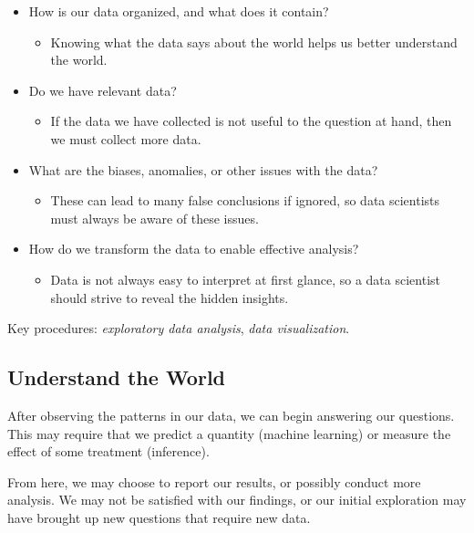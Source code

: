 \documentclass[
  letterpaper,
  DIV=11,
  numbers=noendperiod]{scrreprt}
\providecommand{\tightlist}{%
  \setlength{\itemsep}{0pt}\setlength{\parskip}{0pt}}\usepackage{longtable,booktabs,array}
\begin{document}
\begin{itemize}
\tightlist
\item
  How is our data organized, and what does it contain?

  \begin{itemize}
  \tightlist
  \item
    Knowing what the data says about the world helps us better
    understand the world.
  \end{itemize}
\item
  Do we have relevant data?

  \begin{itemize}
  \tightlist
  \item
    If the data we have collected is not useful to the question at hand,
    then we must collect more data.
  \end{itemize}
\item
  What are the biases, anomalies, or other issues with the data?

  \begin{itemize}
  \tightlist
  \item
    These can lead to many false conclusions if ignored, so data
    scientists must always be aware of these issues.
  \end{itemize}
\item
  How do we transform the data to enable effective analysis?

  \begin{itemize}
  \tightlist
  \item
    Data is not always easy to interpret at first glance, so a data
    scientist should strive to reveal the hidden insights.
  \end{itemize}
\end{itemize}

Key procedures: \emph{exploratory data analysis}, \emph{data
visualization}.

\hypertarget{understand-the-world}{%
\subsection{Understand the World}\label{understand-the-world}}

After observing the patterns in our data, we can begin answering our
questions. This may require that we predict a quantity (machine
learning) or measure the effect of some treatment (inference).

From here, we may choose to report our results, or possibly conduct more
analysis. We may not be satisfied with our findings, or our initial
exploration may have brought up new questions that require new data.
\end{document}
